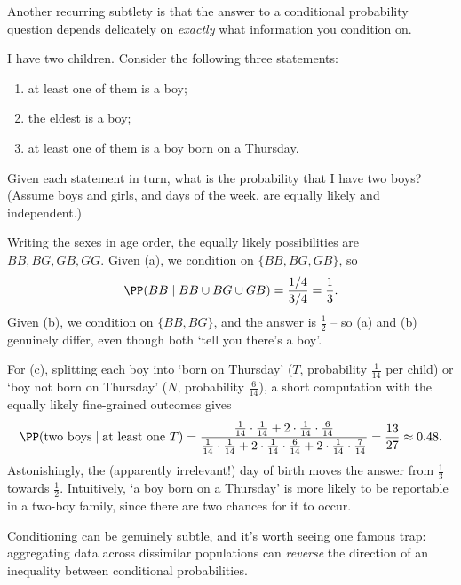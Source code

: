 Another recurring subtlety is that the answer to a conditional probability question depends delicately on \emph{exactly} what information you condition on.

\begin{example}
	I have two children. Consider the following three statements:
	\begin{enumerate}[label=(\alph*)]
		\item at least one of them is a boy;
		\item the eldest is a boy;
		\item at least one of them is a boy born on a Thursday.
	\end{enumerate}
	Given each statement in turn, what is the probability that I have two boys? (Assume boys and girls, and days of the week, are equally likely and independent.)

	Writing the sexes in age order, the equally likely possibilities are $BB, BG, GB, GG$. Given (a), we condition on $\{BB, BG, GB\}$, so
	$$
	\PP(BB \mid BB \cup BG \cup GB) = \frac{1/4}{3/4} = \frac13.
	$$
	Given (b), we condition on $\{BB, BG\}$, and the answer is $\frac12$ -- so (a) and (b) genuinely differ, even though both `tell you there's a boy'.

	For (c), splitting each boy into `born on Thursday' ($T$, probability $\frac{1}{14}$ per child) or `boy not born on Thursday' ($N$, probability $\frac{6}{14}$), a short computation with the equally likely fine-grained outcomes gives
	$$
	\PP(\text{two boys} \mid \text{at least one } T) = \frac{\frac{1}{14}\cdot\frac{1}{14} + 2\cdot\frac{1}{14}\cdot\frac{6}{14}}{\frac{1}{14}\cdot\frac{1}{14} + 2\cdot\frac{1}{14}\cdot\frac{6}{14} + 2 \cdot \frac{1}{14}\cdot\frac{7}{14}} = \frac{13}{27} \approx 0.48.
	$$
	Astonishingly, the (apparently irrelevant!) day of birth moves the answer from $\frac13$ towards $\frac12$. Intuitively, `a boy born on a Thursday' is more likely to be reportable in a two-boy family, since there are two chances for it to occur.
\end{example}

Conditioning can be genuinely subtle, and it's worth seeing one famous trap: aggregating data across dissimilar populations can \emph{reverse} the direction of an inequality between conditional probabilities.

